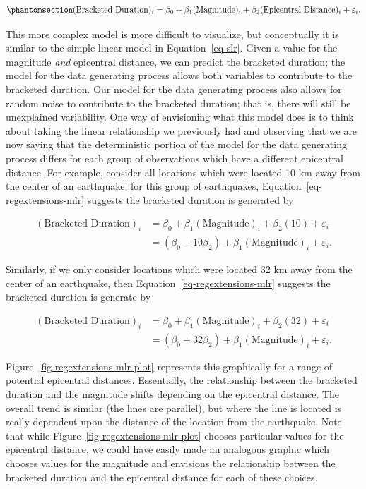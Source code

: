 \documentclass[
  letterpaper,
  DIV=11,
  numbers=noendperiod]{scrreprt}
\theoremstyle{plain}
\theoremstyle{definition}
\theoremstyle{definition}
\theoremstyle{remark}
\begin{document}
\begin{equation}\phantomsection\label{eq-regextensions-mlr}{(\text{Bracketed Duration})_i = \beta_0 + \beta_1(\text{Magnitude})_i + \beta_2(\text{Epicentral Distance})_i + \varepsilon_i.}\end{equation}

This more complex model is more difficult to visualize, but conceptually
it is similar to the simple linear model in Equation~\ref{eq-slr}. Given
a value for the magnitude \emph{and} epicentral distance, we can predict
the bracketed duration; the model for the data generating process allows
both variables to contribute to the bracketed duration. Our model for
the data generating process also allows for random noise to contribute
to the bracketed duration; that is, there will still be unexplained
variability. One way of envisioning what this model does is to think
about taking the linear relationship we previously had and observing
that we are now saying that the deterministic portion of the model for
the data generating process differs for each group of observations which
have a different epicentral distance. For example, consider all
locations which were located 10 km away from the center of an
earthquake; for this group of earthquakes,
Equation~\ref{eq-regextensions-mlr} suggests the bracketed duration is
generated by

\[
\begin{aligned}
(\text{Bracketed Duration})_i 
  &= \beta_0 + \beta_1(\text{Magnitude})_i + \beta_2(10) + \varepsilon_i \\
  &= \left(\beta_0 + 10\beta_2\right) + \beta_1(\text{Magnitude})_i + \varepsilon_i.
\end{aligned}
\]

Similarly, if we only consider locations which were located 32 km away
from the center of an earthquake, then
Equation~\ref{eq-regextensions-mlr} suggests the bracketed duration is
generate by

\[
\begin{aligned}
(\text{Bracketed Duration})_i 
  &= \beta_0 + \beta_1(\text{Magnitude})_i + \beta_2(32) + \varepsilon_i \\
  &= \left(\beta_0 + 32\beta_2\right) + \beta_1(\text{Magnitude})_i + \varepsilon_i.
\end{aligned}
\]

Figure~\ref{fig-regextensions-mlr-plot} represents this graphically for
a range of potential epicentral distances. Essentially, the relationship
between the bracketed duration and the magnitude shifts depending on the
epicentral distance. The overall trend is similar (the lines are
parallel), but where the line is located is really dependent upon the
distance of the location from the earthquake. Note that while
Figure~\ref{fig-regextensions-mlr-plot} chooses particular values for
the epicentral distance, we could have easily made an analogous graphic
which chooses values for the magnitude and envisions the relationship
between the bracketed duration and the epicentral distance for each of
these choices.
\end{document}
